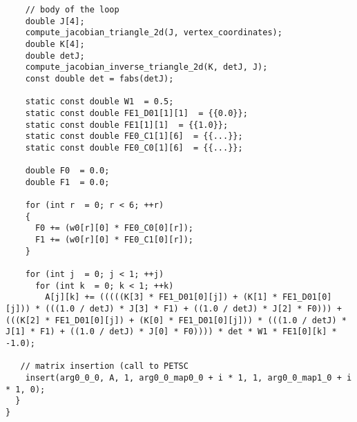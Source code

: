 \documentclass[a4paper]{article}
\begin{document}
\begin{appendices}
\begin{lstlisting}
    // body of the loop
    double J[4];
    compute_jacobian_triangle_2d(J, vertex_coordinates);
    double K[4];
    double detJ;
    compute_jacobian_inverse_triangle_2d(K, detJ, J);  
    const double det = fabs(detJ);

    static const double W1  = 0.5;  
    static const double FE1_D01[1][1]  = {{0.0}};  
    static const double FE1[1][1]  = {{1.0}};  
    static const double FE0_C1[1][6]  = {{...}};  
    static const double FE0_C0[1][6]  = {{...}};

    double F0  = 0.0;
    double F1  = 0.0;

    for (int r  = 0; r < 6; ++r)
    {
      F0 += (w0[r][0] * FE0_C0[0][r]);
      F1 += (w0[r][0] * FE0_C1[0][r]);  
    }

    for (int j  = 0; j < 1; ++j)
      for (int k  = 0; k < 1; ++k)
        A[j][k] += (((((K[3] * FE1_D01[0][j]) + (K[1] * FE1_D01[0][j])) * (((1.0 / detJ) * J[3] * F1) + ((1.0 / detJ) * J[2] * F0))) + (((K[2] * FE1_D01[0][j]) + (K[0] * FE1_D01[0][j])) * (((1.0 / detJ) * J[1] * F1) + ((1.0 / detJ) * J[0] * F0)))) * det * W1 * FE1[0][k] * -1.0);      
   
   // matrix insertion (call to PETSC  
    insert(arg0_0_0, A, 1, arg0_0_map0_0 + i * 1, 1, arg0_0_map1_0 + i * 1, 0);
  }
}
\end{lstlisting}

\end{appendices}



%
%
\end{document}
